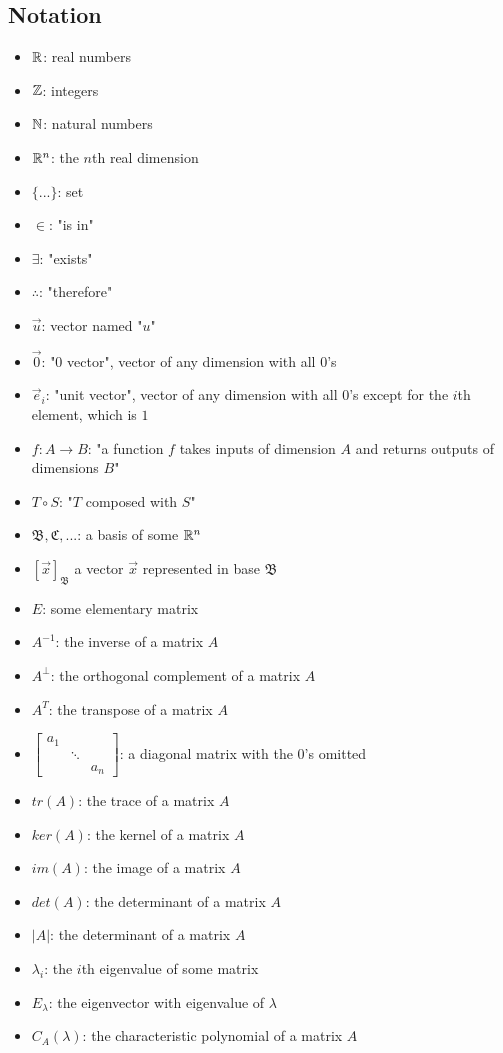 \documentclass[12pt]{article}
\begin{document}
{\subsection{Notation}
    \begin{itemize}
        \item $\mathbb{R}$: real numbers
        \item $\mathbb{Z}$: integers
        \item $\mathbb{N}$: natural numbers
        \item $\mathbb{R}^n$: the $n$th real dimension
        \item $\{...\}$: set
        \item $\in$: "is in"
        \item $\exists$: "exists"
        \item $\therefore$: "therefore"
        \item $\Vec{u}$: vector named "$u$"
        \item $\Vec{0}$: "0 vector", vector of any dimension with all $0$'s
        \item $\vec{e}_i$: "unit vector", vector of any dimension with all $0$'s except for the $i$th element, which is $1$
        \item $f: A \to B$: "a function $f$ takes inputs of dimension $A$ and returns outputs of dimensions $B$"
        \item $T \circ S$: "$T$ composed with $S$"
        \item $\mathfrak{B}, \mathfrak{C}, ...$: a basis of some $\mathbb{R}^n$
        \item $[\vec{x}]_{\mathfrak{B}}$ a vector $\vec{x}$ represented in base $\mathfrak{B}$
        \item $E$: some elementary matrix
       \item $A^{-1}$: the inverse of a matrix $A$
       \item $A^\bot$: the orthogonal complement of a matrix $A$
       \item $A^T$: the transpose of a matrix $A$
       \item $\begin{bmatrix}
           a_1 & \\
            & \ddots&\\
            & & a_n
         \end{bmatrix}$: a diagonal matrix with the $0$'s omitted
       \item $tr(A)$: the trace of a matrix $A$
       \item $ker(A)$: the kernel of a matrix $A$
       \item $im(A)$: the image of a matrix $A$
       \item $det(A)$: the determinant of a matrix $A$
       \item $|A|$: the determinant of a matrix $A$
       \item $\lambda_i$: the $i$th eigenvalue of some matrix
       \item $E_\lambda$: the eigenvector with eigenvalue of $\lambda$
       \item $C_A(\lambda)$: the characteristic polynomial of a matrix $A$
    \end{itemize}
\newpage
}
\end{document}
